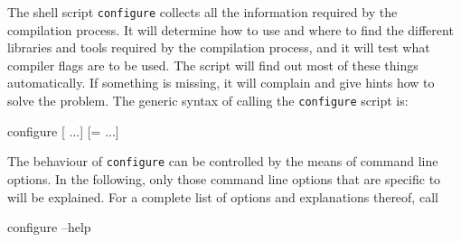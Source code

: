 
 The shell script \texttt{configure} collects all the
information required by the compilation process. It will determine how
to use and where to find the different libraries and tools required by
the compilation process, and it will test what compiler flags are to
be used.  The script will find out most of these things automatically.
If something is missing, it will complain and give hints how to solve
the problem.  The generic syntax of calling the \texttt{configure}
script is:
\begin{code}
configure [ ...] [= ...]
\end{code}

 The behaviour of \texttt{configure} can be
controlled by the means of command line options. In the following,
only those command line options that are specific to \es{} will be
explained.  For a complete list of options and explanations thereof,
call
\begin{code}
configure --help
\end{code}


